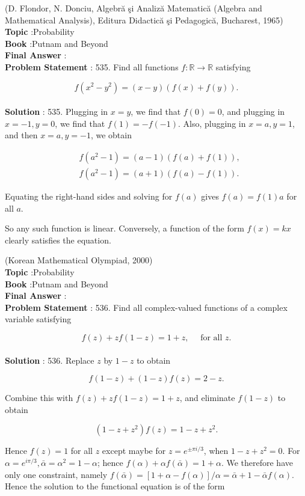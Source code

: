 \documentclass[10pt]{article}
\begin{document}
(D. Flondor, N. Donciu, Algebră şi Analiză Matematică (Algebra and Mathematical Analysis), Editura Didactică şi Pedagogică, Bucharest, 1965)
\\
\textbf{Topic} :Probability\\
\textbf{Book} :Putnam and Beyond\\
\textbf{Final Answer} :\\


\textbf{Problem Statement} :
535. Find all functions $f: \mathbb{R} \rightarrow \mathbb{R}$ satisfying

$$
f\left(x^{2}-y^{2}\right)=(x-y)(f(x)+f(y)) .
$$
\\
\textbf{Solution} :
535. Plugging in $x=y$, we find that $f(0)=0$, and plugging in $x=-1, y=0$, we find that $f(1)=-f(-1)$. Also, plugging in $x=a, y=1$, and then $x=a, y=-1$, we obtain

$$
\begin{aligned}
&f\left(a^{2}-1\right)=(a-1)(f(a)+f(1)), \\
&f\left(a^{2}-1\right)=(a+1)(f(a)-f(1)) .
\end{aligned}
$$

Equating the right-hand sides and solving for $f(a)$ gives $f(a)=f(1) a$ for all $a$.

So any such function is linear. Conversely, a function of the form $f(x)=k x$ clearly satisfies the equation.

(Korean Mathematical Olympiad, 2000)
\\
\textbf{Topic} :Probability\\
\textbf{Book} :Putnam and Beyond\\
\textbf{Final Answer} :\\


\textbf{Problem Statement} :
536. Find all complex-valued functions of a complex variable satisfying

$$
f(z)+z f(1-z)=1+z, \quad \text { for all } z .
$$
\\
\textbf{Solution} :
536. Replace $z$ by $1-z$ to obtain

$$
f(1-z)+(1-z) f(z)=2-z .
$$

Combine this with $f(z)+z f(1-z)=1+z$, and eliminate $f(1-z)$ to obtain

$$
\left(1-z+z^{2}\right) f(z)=1-z+z^{2} .
$$

Hence $f(z)=1$ for all $z$ except maybe for $z=e^{\pm \pi i / 3}$, when $1-z+z^{2}=0$. For $\alpha=e^{i \pi / 3}, \bar{\alpha}=\alpha^{2}=1-\alpha$; hence $f(\alpha)+\alpha f(\bar{\alpha})=1+\alpha$. We therefore have only one constraint, namely $f(\bar{\alpha})=[1+\alpha-f(\alpha)] / \alpha=\bar{\alpha}+1-\bar{\alpha} f(\alpha)$. Hence the solution to the functional equation is of the form
\end{document}
